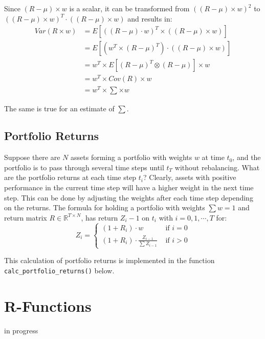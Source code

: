 \documentclass[
  oneside]{book}
\begin{document}
Since \((R - \mu) \times w\) is a scalar, it can be transformed from \(((R - \mu) \times w)^2\) to \(((R - \mu) \times w)^T \cdot ((R - \mu) \times w)\) and results in:
\begin{align*}
  Var(R \times w) &= E[((R - \mu) \cdot w)^T \times ((R - \mu) \times w)]\\ 
  &= E[(w^T \times (R - \mu)^T) \cdot ((R - \mu) \times w)]\\ 
  &= w^T \times E[(R - \mu)^T \otimes (R - \mu)] \times w \\
  &= w^T \times Cov(R) \times w \\
  &= w^T \times \textstyle\sum \times w
\end{align*}

The same is true for an estimate of \(\textstyle\sum\).

\hypertarget{portfolioreturns}{%
\subsection{Portfolio Returns}\label{portfolioreturns}}

Suppose there are \(N\) assets forming a portfolio with weights \(w\) at time \(t_0\), and the portfolio is to pass through several time steps until \(t_T\) without rebalancing. What are the portfolio returns at each time step \(t_i\)? Clearly, assets with positive performance in the current time step will have a higher weight in the next time step. This can be done by adjusting the weights after each time step depending on the returns. The formula for holding a portfolio with weights \(\textstyle\sum w = 1\) and return matrix \(R \in \mathbb{R}^{T \times N}\), has return \(Z_i-1\) on \(t_i\) with \(i=0, 1, \cdots, T\) for:
\[
  Z_i =
  \begin{cases}
  (1+R_i)\cdot w &\text{ if }i=0\\
  (1+R_i)\cdot \frac{Z_{i-1}}{\sum Z_{i-1}} &\text{ if }i>0
  \end{cases}
\]

This calculation of portfolio returns is implemented in the function \texttt{calc\_portfolio\_returns()} below.

\hypertarget{r-functions-2}{%
\section{R-Functions}\label{r-functions-2}}

\textbar\textbar\textbar in progress\textbar\textbar\textbar{}\\
\end{document}
